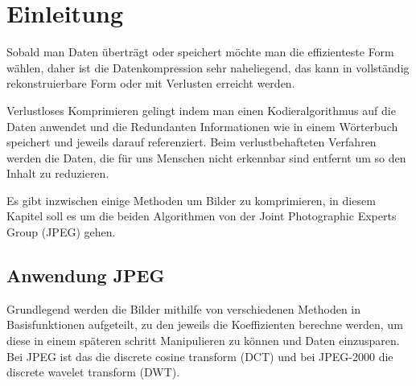 %
%
%
%
\section{Einleitung\label{jpeg:section:einleitung}}
Sobald man Daten überträgt oder speichert möchte man die effizienteste Form wählen, daher ist die Datenkompression sehr naheliegend, das kann in vollständig rekonstruierbare Form oder mit Verlusten erreicht werden.

Verlustloses Komprimieren gelingt indem man einen Kodieralgorithmus auf die Daten anwendet und die Redundanten Informationen wie in einem Wörterbuch speichert und jeweils darauf referenziert. Beim verlustbehafteten Verfahren werden die Daten, die für uns Menschen nicht erkennbar sind entfernt um so den Inhalt zu reduzieren.

Es gibt inzwischen einige Methoden um Bilder zu komprimieren, in diesem Kapitel soll es um die beiden Algorithmen von der Joint Photographic Experts Group (JPEG) gehen.

\subsection{Anwendung JPEG\label{jpeg:subsection:anwendung}}
Grundlegend werden die Bilder mithilfe von verschiedenen Methoden in Basisfunktionen aufgeteilt, zu den jeweils die Koeffizienten berechne werden, um diese in einem späteren schritt Manipulieren zu können und Daten einzusparen. 
Bei JPEG ist das die \glqq discrete cosine transform \grqq  (DCT) und bei JPEG-2000 die \glqq discrete wavelet transform \grqq  (DWT).